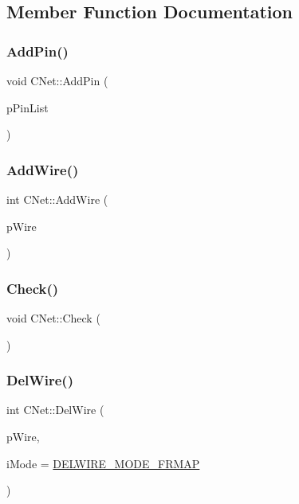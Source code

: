 \subsection{Member Function Documentation}
\mbox{\label{classCNet_a6fbe191b6e69b29fb54d409779caf776}} 
\subsubsection{\texorpdfstring{AddPin()}{AddPin()}}
{\footnotesize\ttfamily void C\+Net\+::\+Add\+Pin (\begin{DoxyParamCaption}\item[{vector$<$ \mbox{\hyperlink{classCPin}{C\+Pin}} $\ast$ $>$ $\ast$}]{p\+Pin\+List }\end{DoxyParamCaption})}

\mbox{\label{classCNet_a95e5735a7449f7d54fe97c335a65fccc}} 
\subsubsection{\texorpdfstring{AddWire()}{AddWire()}}
{\footnotesize\ttfamily int C\+Net\+::\+Add\+Wire (\begin{DoxyParamCaption}\item[{\mbox{\hyperlink{classCWire}{C\+Wire}} $\ast$}]{p\+Wire }\end{DoxyParamCaption})}

\mbox{\label{classCNet_a14518e3935990afad52bbaf4a257614c}} 
\subsubsection{\texorpdfstring{Check()}{Check()}}
{\footnotesize\ttfamily void C\+Net\+::\+Check (\begin{DoxyParamCaption}{ }\end{DoxyParamCaption})}

\mbox{\label{classCNet_a26f0aadddc16f2e5ec33a3b2e5f4e97a}} 
\subsubsection{\texorpdfstring{DelWire()}{DelWire()}}
{\footnotesize\ttfamily int C\+Net\+::\+Del\+Wire (\begin{DoxyParamCaption}\item[{\mbox{\hyperlink{classCWire}{C\+Wire}} $\ast$}]{p\+Wire,  }\item[{int}]{i\+Mode = {\ttfamily \mbox{\hyperlink{BoxRouter_8h_a2675adf9c4b7c477e4a85507b9a1f23a}{D\+E\+L\+W\+I\+R\+E\+\_\+\+M\+O\+D\+E\+\_\+\+F\+R\+M\+AP}}} }\end{DoxyParamCaption})}

